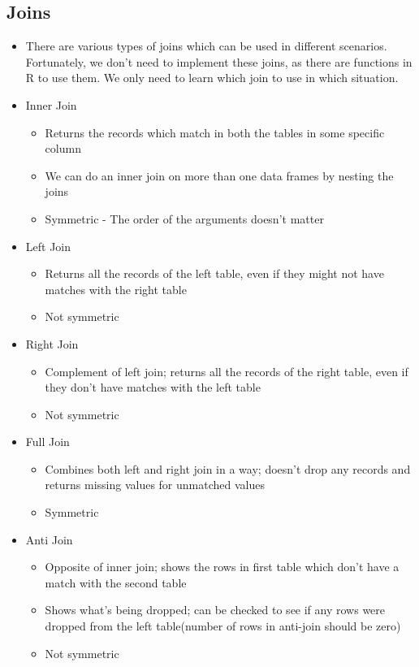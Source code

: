 \subsection{Joins}
\begin{itemize}
    \item There are various types of joins which can be used in different scenarios. Fortunately, we don't need to implement these joins, as there are functions in R to use them. We only need to learn which join to use in which situation.
        \item Inner Join
        \begin{itemize}
            \item Returns the records which match in both the tables in some specific column
            \item We can do an inner join on more than one data frames by nesting the joins
            \item Symmetric - The order of the arguments doesn't matter
        \end{itemize}
        \item Left Join
        \begin{itemize}
            \item Returns all the records of the left table, even if they might not have matches with the right table
            \item Not symmetric
        \end{itemize}
        \item Right Join
        \begin{itemize}
            \item Complement of left join; returns all the records of the right table, even if they don't have matches with the left table
            \item Not symmetric
        \end{itemize}
        \item Full Join
        \begin{itemize}
            \item Combines both left and right join in a way; doesn't drop any records and returns missing values for unmatched values
            \item Symmetric
        \end{itemize}
        \item Anti Join
        \begin{itemize}
            \item Opposite of inner join; shows the rows in first table which don't have a match with the second table
            \item Shows what's being dropped; can be checked to see if any rows were dropped from the left table(number of rows in anti-join should be zero)
            \item Not symmetric
        \end{itemize}
\end{itemize}

